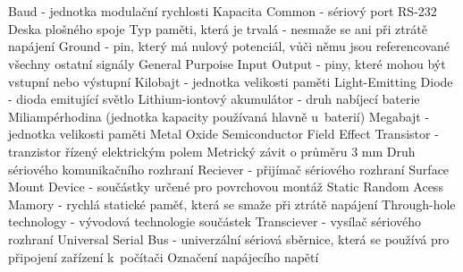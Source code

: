 \cleardoublepage
\chapter*{\listofabbrevname}
{}

\begin{acronym}[KolikMista]
		{Baud - jednotka modulační rychlosti}
		{Kapacita}
		{Common - sériový port RS-232}
		{Deska plošného spoje}
		{Typ paměti, která je trvalá - nesmaže se ani při ztrátě napájení}
		{Ground - pin, který má nulový potenciál, vůči němu jsou referencované všechny ostatní signály}
		{General Purpoise Input Output - piny, které mohou být vstupní nebo výstupní}
		{Kilobajt - jednotka velikosti paměti}
		{Light-Emitting Diode - dioda emitující světlo}
		{Lithium-iontový akumulátor - druh nabíjecí baterie}
		{Miliampérhodina (jednotka kapacity používaná hlavně u~baterií)}
		{Megabajt - jednotka velikosti paměti}
		{Metal Oxide Semiconductor Field Effect Transistor - tranzistor řízený elektrickým polem}	
		{Metrický závit o průměru 3 mm}	
		{Druh sériového komunikačního rozhraní} 
		{Reciever - přijímač sériového rozhraní}
		{Surface Mount Device - součástky určené pro povrchovou montáž} 
		{Static Random Acess Mamory - rychlá statické paměť, která se smaže při ztrátě napájení}	
		{Through-hole technology - vývodová technologie součástek}
		{Transciever - vysílač sériového rozhraní} 
		{Universal Serial Bus - univerzální sériová sběrnice, která se používá pro připojení zařízení k~počítači}
		{Označení napájecího napětí}

\end{acronym}
